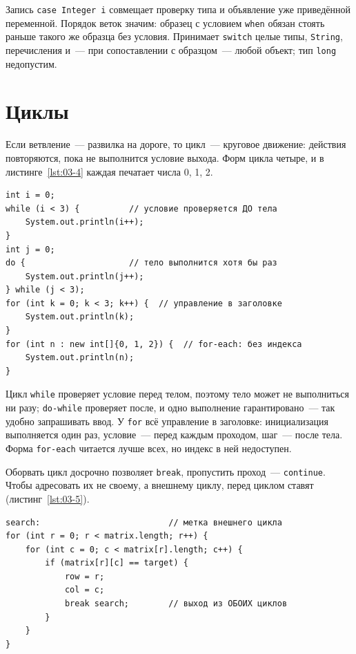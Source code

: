Запись \texttt{case Integer i} совмещает проверку типа и объявление уже
приведённой переменной. Порядок веток значим: образец с условием \texttt{when}
обязан стоять раньше такого же образца без условия. Принимает \texttt{switch}
целые типы, \texttt{String}, перечисления и~--- при сопоставлении с
образцом~--- любой объект; тип \texttt{long} недопустим.

\section{Циклы}

Если ветвление~--- развилка на дороге, то цикл~--- круговое движение: действия
повторяются, пока не выполнится условие выхода. Форм цикла четыре, и в
листинге~\ref{lst:03-4} каждая печатает числа 0, 1, 2.

\begin{listing}[H]
\begin{verbatim}
int i = 0;
while (i < 3) {          // условие проверяется ДО тела
    System.out.println(i++);
}
int j = 0;
do {                     // тело выполнится хотя бы раз
    System.out.println(j++);
} while (j < 3);
for (int k = 0; k < 3; k++) {  // управление в заголовке
    System.out.println(k);
}
for (int n : new int[]{0, 1, 2}) {  // for-each: без индекса
    System.out.println(n);
}
\end{verbatim}
\caption{Четыре формы цикла}
\label{lst:03-4}
\end{listing}

Цикл \texttt{while} проверяет условие перед телом, поэтому тело может не
выполниться ни разу; \texttt{do-while} проверяет после, и одно выполнение
гарантировано~--- так удобно запрашивать ввод. У \texttt{for} всё управление в
заголовке: инициализация выполняется один раз, условие~--- перед каждым
проходом, шаг~--- после тела. Форма \texttt{for-each} читается лучше всех, но
индекс в ней недоступен.

Оборвать цикл досрочно позволяет \texttt{break}, пропустить проход~---
\texttt{continue}. Чтобы адресовать их не своему, а внешнему циклу, перед
циклом ставят  (листинг~\ref{lst:03-5}).

\begin{listing}[H]
\begin{verbatim}
search:                          // метка внешнего цикла
for (int r = 0; r < matrix.length; r++) {
    for (int c = 0; c < matrix[r].length; c++) {
        if (matrix[r][c] == target) {
            row = r;
            col = c;
            break search;        // выход из ОБОИХ циклов
        }
    }
}
\end{verbatim}
\caption{break с меткой}
\label{lst:03-5}
\end{listing}

